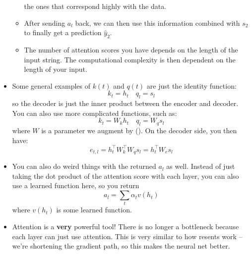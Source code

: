 \begin{itemize}
\begin{itemize}
				the ones that correspond highly with the data.  
			\item After sending \( a_l \) back, we can then use this information
				combined with \( s_2 \) to finally get a prediction \( \hat{y}_{2}
				\).   
			\item The number of attention scores you have depends on the length of
				the input string. The computational complexity is then dependent on
				the length of your input. 
		\end{itemize}
	\item Some general examples of \( k(t) \) and \( q(t) \) are just the identity
		function:
		\[
			k_t = h_t \quad q_l = s_l
		\]
		so the decoder is just the inner product between the encoder and decoder. You
		can also use more complicated functions, such as:
		\[
			k_t = W_k h_t \quad q_l = W_q s_l
		\]
		where \( W \) is a parameter we augment by (). On
		the decoder side, you then have:
		\[
			e_{t, l} = h_{t}^{\top} W_k^{\top} W_q s_l = h_{t}^{\top}W_e s_l
		\]
	\item You can also do weird things with the returned \( a_l \) as well. Instead
		of just taking the dot product of the attention score with each layer, you
		can also use a learned function here, so you return
		\[
			a_l = \sum_t \alpha_t v(h_t)
		\]
		where \( v(h_t) \) is some learned function.  

	\item Attention is a \textbf{very} powerful tool! There is no longer a bottleneck
		because each layer can just use attention. This is very similar to how
		resents work -- we're shortening the gradient path, so this makes the neural
		net better. 
\end{itemize}
